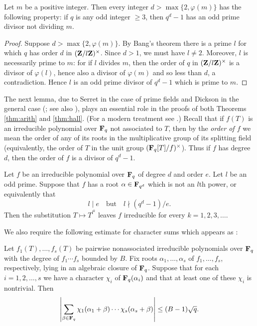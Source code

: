 \documentclass[a4paper]{compositio}
\begin{document}
\begin{cor}\label{cor:bangcor} Let $m$ be a positive integer. Then every integer $d > \max\{2, \varphi(m)\}$ has the following property: if $q$ is any odd integer $\geq
3$, then $q^d-1$ has an odd prime divisor not dividing $m$.
\end{cor}
\begin{proof} Suppose $d >
\max\{2,\varphi(m)\}$. By Bang's theorem there is a prime $l$ for
which $q$ has order $d$ in $(\mathbf{Z}/l\mathbf{Z})^{\times}$. Since $d > 1$, we
must have $l \neq 2$. Moreover, $l$ is necessarily prime to $m$: for
if $l$ divides $m$, then the order of $q$ in $(\mathbf{Z}/l\mathbf{Z})^{\times}$ is
a divisor of $\varphi(l)$, hence also a divisor of $\varphi(m)$ and
so less than $d$, a contradiction. Hence $l$ is an odd prime divisor
of $q^d-1$ which is prime to $m$.
\end{proof}

The next lemma, due to Serret in the case of prime fields
\cite[Th\'{e}or\`{e}me I, p. 656]{serret86} and Dickson in the
general case (\cite[p. 382]{dickson97}; see also
\cite[\S34]{dickson58}), plays an essential role in the proofs of
both Theorems \ref{thm:arith} and \ref{thm:hall}. (For a modern
treatment see \cite[Theorem 3.3.5]{ln97}.) Recall that if $f(T)$ is
an irreducible polynomial over $\mathbf{F}_q$ not associated to $T$, then by
the \emph{order of $f$} we mean the order of any of its roots in the
multiplicative group of its splitting field (equivalently, the order
of $T$ in the unit group $(\mathbf{F}_q[T]/f)^{\times}$). Thus if $f$ has
degree $d$, then the order of $f$ is a divisor of $q^d-1$.

\begin{lem}\label{lem:dickson} Let $f$ be an irreducible
polynomial over $\mathbf{F}_q$ of degree $d$ and order $e$. Let $l$ be an
odd prime. Suppose that $f$ has a root $\alpha \in \mathbf{F}_{q^d}$ which
is not an $l$th power, or equivalently that
\begin{equation}\label{eq:hallcond} l \mid e \quad \text{but}
\quad l \nmid (q^{d}-1)/e.
\end{equation}
Then the substitution $T \mapsto T^{l^k}$ leaves $f$ irreducible for
every $k=1, 2, 3,\dots$.
\end{lem}

We also require the following estimate for character sums which
appears as \cite[Lemma 7]{pollack06a}:
\begin{lem}\label{lem:charest} Let $f_1(T), \dots, f_s(T)$ be pairwise nonassociated
irreducible polynomials over $\mathbf{F}_q$ with the degree of $f_1 \cdots
f_s$ bounded by $B$. Fix roots $\alpha_1, \dots, \alpha_s$ of $f_1,
\dots, f_s$, respectively, lying in an algebraic closure of $\mathbf{F}_q$.
Suppose that for each $i=1, 2, \dots, s$ we have a character
$\chi_i$ of $\mathbf{F}_{q}(\alpha_i)$ and that at least one of these
$\chi_i$ is nontrivial. Then
\begin{equation}\label{eq:wanbound} \left|\sum_{\beta \in
\mathbf{F}_q}\chi_1(\alpha_1+\beta) \cdots \chi_s(\alpha_s+\beta)\right|
\leq (B - 1)\sqrt{q}.
\end{equation}
\end{lem}
\end{document}
